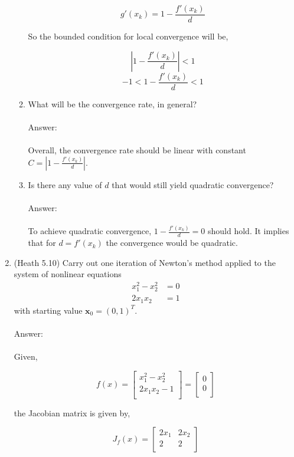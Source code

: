 \documentclass{article}
\renewcommand{\vec}[1]{\mathbf{#1}}
\begin{document}
\begin{enumerate}
\begin{enumerate}
$$g'(x_k)=1-\frac{f'(x_k)}{d}$$

So the bounded condition for local convergence will be,

$$\left|1-\frac{f'(x_k)}{d}\right|<1$$
$$-1<1-\frac{f'(x_k)}{d}<1$$

\item What will be the convergence rate, in general?
\\
\\
Answer:\\
\\
Overall, the convergence rate should be linear with constant $C=\left|1-\frac{f'(x_k)}{d}\right|$.\\
\item Is there any value of $d$ that would still yield quadratic convergence?
\\
\\
Answer:\\
\\
To achieve quadratic convergence, $1-\frac{f'(x_k)}{d}=0$ should hold.  It implies that for $d=f'(x_k)$ the convergence would be quadratic.
\end{enumerate}

\item (Heath 5.10)  Carry out one iteration of Newton's method applied to the system of nonlinear equations
\begin{align*}
x_1^2 - x_2^2 &= 0 \\
2 x_1 x_2 &= 1
\end{align*}
with starting value $\vec{x}_0 = ( 0, 1 )^T$.
\\
\\
Answer:\\
\\
Given,

$$f(x)=\left[\begin{array}{c} x_1^2-x_2^2 \\ 2x_1x_2-1 \\ \end{array}\right]=\left[\begin{array}{c} 0 \\ 0 \\ \end{array}\right]$$

the Jacobian matrix is given by,

$$J_f(x)=\left[\begin{array}{cc} 2x_1 & 2x_2 \\ 2 & 2 \\ \end{array}\right]$$


\end{enumerate}
\end{document}
